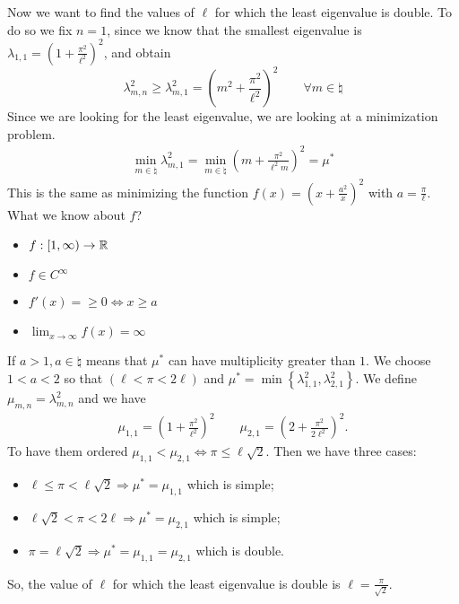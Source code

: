 Now we want to find the values of \(\ell\) for which the least eigenvalue is
double. To do so we fix \(n = 1\), since we know that the smallest eigenvalue
is \(\lambda_{1,1} = \left(1 + \frac{\pi^2}{\ell^2}\right)^2\), and obtain
\[
    \lambda_{m, n}^2 \geq \lambda_{m, 1}^2 = \left( m^2 + \frac{\pi^2}{\ell^2} \right)^2 \qquad \forall m \in \natural
\]
Since we are looking for the least eigenvalue, we are looking at a minimization
problem.
\[
    \begin{split}
        \min_{m \in \natural} \lambda_{m, 1}^2 = \min_{m \in \natural} \left( m + \frac{\pi^2}{\ell^2 m} \right)^2 = \mu^*
    \end{split}
\]
This is the same as minimizing the function \(f(x) = (x + \frac{a^2}{x})^2\)
with \(a = \frac{\pi}{\ell}\). What we know about \(f\)?
\begin{itemize}
    \item \(f : [1, \infty) \to \mathbb{R}\)
    \item \(f \in C^\infty\)
    \item \(f'(x) = \geq 0 \iff x \geq a\)
    \item \(\lim_{x \to \infty} f(x) = \infty\)
\end{itemize}
If \(a > 1, a \in \natural\) means that \(\mu^*\) can have multiplicity greater than \(1\). We choose \(1 < a < 2\) so that \((\ell < \pi < 2\ell)\) and \(\mu^* = \min\left\{\lambda_{1,1}^2, \lambda_{2,1}^2\right\}\). We define \(\mu_{m,n} = \lambda_{m,n}^2\) and we have
\[
    \begin{split}
        \mu_{1,1} = \left(1 + \frac{\pi^2}{\ell^2}\right)^2 \qquad \mu_{2,1} = \left(2 + \frac{\pi^2}{2 \ell^2}\right)^2.
    \end{split}
\]
To have them ordered \(\mu_{1,1} < \mu_{2,1} \iff \pi \leq \ell \sqrt{2}\).
Then we have three cases:
\begin{itemize}
    \item \(\ell \leq \pi < \ell \sqrt{2} \Rightarrow \mu^* = \mu_{1,1}\) which is simple;
    \item \(\ell \sqrt{2} < \pi < 2\ell \Rightarrow \mu^* = \mu_{2,1}\) which is simple;
    \item \(\pi = \ell \sqrt{2} \Rightarrow \mu^* = \mu_{1,1} = \mu_{2,1}\) which is double.
\end{itemize}
So, the value of \(\ell\) for which the least eigenvalue is double is \(\ell = \frac{\pi}{\sqrt{2}}\).

\newpage
